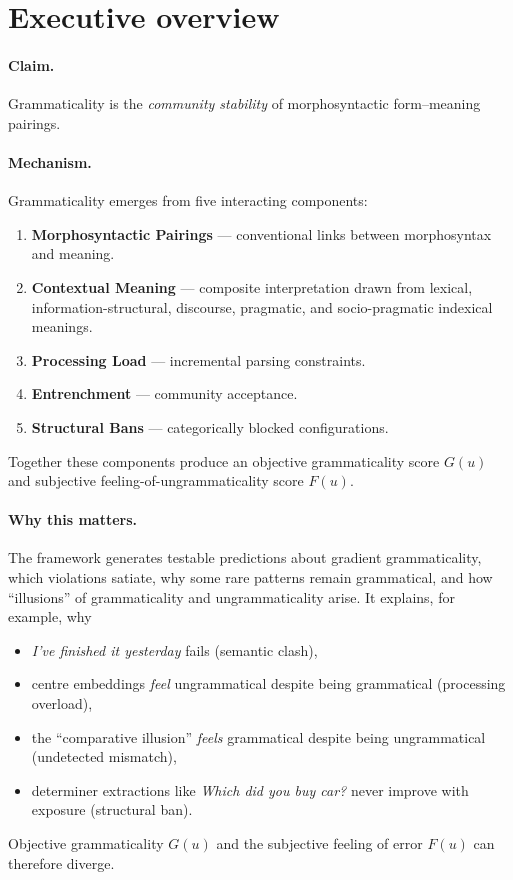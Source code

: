 \documentclass[12pt]{article}
\begin{document}
\section{Executive overview}

\paragraph*{Claim.}%
Grammaticality is the \emph{community stability} of morphosyntactic form–meaning pairings.

\paragraph*{Mechanism.}%
Grammaticality emerges from five interacting components:

\begin{enumerate}
    \item \textbf{Morphosyntactic Pairings} — conventional links between morphosyntax and meaning.
    \item \textbf{Contextual Meaning} — composite interpretation drawn from lexical, information-structural, discourse, pragmatic, and socio-pragmatic indexical meanings.
    \item \textbf{Processing Load} — incremental parsing constraints.
    \item \textbf{Entrenchment} — community acceptance.
    \item \textbf{Structural Bans} — categorically blocked configurations.
\end{enumerate}

Together these components produce an objective grammaticality score \(G(u)\) and subjective feeling-of-ungrammaticality score \(F(u)\).

\paragraph*{Why this matters.}
The framework generates testable predictions about gradient grammaticality, which violations satiate, why some rare patterns remain grammatical, and how \enquote{illusions} of grammaticality and ungrammaticality arise. It explains, for example, why
\begin{itemize}
    \item \textit{I've finished it yesterday} fails (semantic clash),  
    \item centre embeddings \emph{feel} ungrammatical despite being grammatical (processing overload),
    \item the \enquote{comparative illusion} \emph{feels} grammatical despite being ungrammatical (undetected mismatch),
    \item determiner extractions like \textit{Which did you buy car?} never improve with exposure (structural ban).
\end{itemize}
Objective grammaticality \(G(u)\) and the subjective feeling of error \(F(u)\) can therefore diverge.
\end{document}
